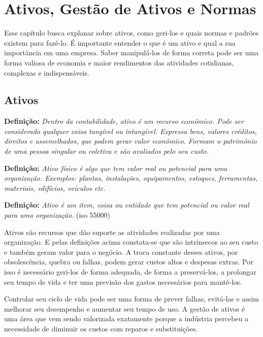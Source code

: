 
\chapter{Ativos, Gestão de Ativos e Normas}
\label{cap-ativos}

Esse capítulo busca explanar sobre ativos, como geri-los e quais normas e padrões existem para fazê-lo. É importante entender o que é um ativo e qual a sua importância em uma empresa. Saber manipulá-los de forma correta pode ser uma forma valiosa de economia e maior rendimentos das atividades cotidianas, complexas e indispensáveis.

\section{Ativos}

\textbf{Definição:} \emph{Dentro da contabilidade, ativo é um recurso econômico. Pode ser considerado qualquer coisa tangível ou intangível. Expressa bens, valores créditos, direitos e assemelhados, que podem gerar valor econômico. Formam o patrimônio de uma pessoa singular ou coletiva e são avaliados pelo seu custo.} \cite{sullivan2003}\cite{fulgencio2007} 

\textbf{Definição:} \emph{Ativo físico é algo que tem valor real ou potencial para uma organização.
Exemplos: plantas, instalações, equipamentos, estoques, ferramentas, materiais, edifícios, veículos etc.} \cite{nicolay2015}

\textbf{Definição:} \emph{Ativo é um item, coisa ou entidade que tem potencial ou valor real para uma organização.} (iso 55000)

Ativos são recursos que dão suporte as atividades realizadas por uma organização. E pelas definições acima constata-se que são intrínsecos ao seu custo e também geram valor para o negócio. A troca constante desses ativos, por obsolescência, quebra ou falhas, podem gerar custos altos e despesas extras. Por isso é necessário geri-los de forma adequada, de forma a preservá-los, a prolongar seu tempo de vida e ter uma previsão dos gastos necessários para mantê-los. 

Controlar seu ciclo de vida pode ser uma forma de prever falhas, evitá-las e assim melhorar seu desempenho e aumentar seu tempo de uso. A gestão de ativos é uma área que vem sendo valorizada exatamente porque a indústria percebeu a necessidade de diminuir os custos com reparos e substituições.

